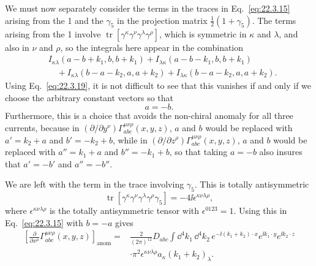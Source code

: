We must now separately consider the terms in the traces in
Eq.~\eqref{eq:22.3.15} arising from the 1 and the $\gamma_5$ in the
projection matrix $\tfrac12(1+\gamma_5)$. The terms arising from the 1
involve $\operatorname{tr}[\gamma^\kappa\gamma^\nu
\gamma^\lambda\gamma^\rho]$, which is symmetric in $\kappa$ and $\lambda$,
and also in $\nu$ and $\rho$, so the integrals here appear in the
combination
\[
 \begin{aligned}
 &I_{\kappa\lambda}(a-b+k_1,b,b+k_1)
 +I_{\lambda\kappa}(a-b-k_1,b,b+k_1)
 \\
 &\quad
 +I_{\kappa\lambda}(b-a-k_2,a,a+k_2)
 +I_{\lambda\kappa}(b-a-k_2,a,a+k_2).
 \end{aligned}
\]
Using Eq.~\eqref{eq:22.3.19}, it is not difficult to see that this vanishes
if and only if we choose the arbitrary constant vectors so that
\begin{equation}
 a=-b.
 \tag{22.3.20}\label{eq:22.3.20}
\end{equation}
Furthermore, this is a choice that avoids the non-chiral anomaly for all
three currents, because in
$(\partial/\partial y^\nu)\Gamma_{abc}^{\mu\nu\rho}(x,y,z)$,
$a$ and $b$ would be replaced with $a'=k_2+a$ and $b'=-k_2+b$, while in
$(\partial/\partial z^\rho)\Gamma_{abc}^{\mu\nu\rho}(x,y,z)$,
$a$ and $b$ would be replaced with $a''=k_1+a$ and $b''=-k_1+b$, so that
taking $a=-b$ also insures that $a'=-b'$ and $a''=-b''$.

We are left with the term in the trace involving $\gamma_5$. This is
totally antisymmetric
\begin{equation}
 \operatorname{tr}
 \left[\gamma^\kappa\gamma^\nu\gamma^\lambda\gamma^\rho\gamma_5\right]
 =-4\ii\epsilon^{\kappa\nu\lambda\rho},
 \tag{22.3.21}\label{eq:22.3.21}
\end{equation}
where $\epsilon^{\kappa\nu\lambda\rho}$ is the totally antisymmetric tensor
with $\epsilon^{0123}=1$. Using this in Eq.~\eqref{eq:22.3.15} with $b=-a$
gives
\begin{equation}
 \begin{aligned}
 \left[
  \frac{\partial}{\partial x^\mu}
  \Gamma_{abc}^{\mu\nu\rho}(x,y,z)
 \right]_{\mathrm{anom}}
 ={}&\frac{2}{(2\pi)^{12}}D_{abc}
 \int \dd^4k_1\,\dd^4k_2\,
 e^{-\ii(k_1+k_2)\cdot x}e^{\ii k_1\cdot y}e^{\ii k_2\cdot z}
 \\
 &\cdot\pi^2\epsilon^{\kappa\nu\lambda\rho}
 a_\kappa(k_1+k_2)_\lambda.
 \end{aligned}
 \tag{22.3.22}\label{eq:22.3.22}
\end{equation}

